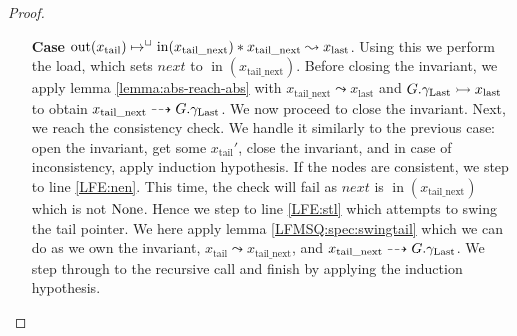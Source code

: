 \documentclass[a4paper, 10pt]{report}
\theoremstyle{definition}
\newcommand{\nIn}[1]{\operatorname{in}(#1)}
\newcommand{\nOut}[1]{\operatorname{out}(#1)}
\newcommand{\node}{x}
\newcommand{\nodeN}[1]{\node_{\mathrm{#1}}}
\newcommand{\nodetail}{\nodeN{tail}}
\newcommand{\nodelast}{\nodeN{last}}
\newcommand{\nodetailnext}{\nodeN{tail\_next}}
\newcommand{\Qg}{G}
\newcommand{\glast}{\gname_{\mathrm{Last}}}
\newcommand{\reach}[2]{#1 \leadsto #2}
\newcommand{\ar}[2]{#1 \dashrightarrow #2}
\newcommand{\ap}[2]{#1 \rightarrowtail #2}
\begin{document}
\begin{proof}
\begin{itemize}
    \item[\textbf{Case}]
    $\nOut{\nodetail} \mapsto^{\persistently} \nIn{\nodetailnext} \star{} \reach{\nodetailnext}{\nodelast}$. Using this we perform the load, which sets $next$ to $\nIn{\nodetailnext}$. Before closing the invariant, we apply lemma \ref{lemma:abs-reach-abs} with $\reach{\nodetailnext}{\nodelast}$ and $\ap{\Qg.\glast}{\nodelast}$ to obtain $\ar{\nodetailnext}{\Qg.\glast}$. We now proceed to close the invariant. Next, we reach the consistency check. We handle it similarly to the previous case: open the invariant, get some $\nodetail'$, close the invariant, and in case of inconsistency, apply induction hypothesis. If the nodes are consistent, we step to line \ref{LFE:nen}. This time, the check will fail as $next$ is $\nIn{\nodetailnext}$ which is not $\operatorname{None}$. Hence we step to line \ref{LFE:stl} which attempts to swing the tail pointer. We here apply lemma \ref{LFMSQ:spec:swingtail} which we can do as we own the invariant, $\reach{\nodetail}{\nodetailnext}$, and $\ar{\nodetailnext}{\Qg.\glast}$. We step through to the recursive call and finish by applying the induction hypothesis.
  \end{itemize}
\end{proof}
\end{document}
